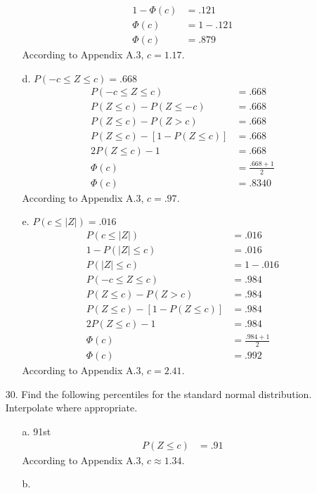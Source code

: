 \documentclass[letterpaper,12pt]{article}
\begin{document}
\begin{enumerate}
\begin{enumerate}
\begin{align*}
          1 - \Phi(c) &= .121 \\
          \Phi(c) &= 1 - .121 \\
          \Phi(c) &= .879
        \end{align*}
        According to Appendix A.3, $c = 1.17$.
      \item[d.]
        $P(-c \le Z \le c) = .668$
        \begin{align*}
          P(-c \le Z \le c) &= .668 \\
          P(Z \le c) - P(Z \le -c) &= .668 \\
          P(Z \le c) - P(Z > c) &= .668 \\
          P(Z \le c) - [1 - P(Z \le c)] &= .668 \\
          2P(Z \le c) - 1 &= .668 \\
          \Phi(c) &= \frac{.668 + 1}{2} \\
          \Phi(c) &= .8340
        \end{align*}
        According to Appendix A.3, $c = .97$.
      \item[e.]
        $P(c \le |Z|) = .016$
        \begin{align*}
          P(c \le |Z|) &= .016 \\
          1 - P(|Z| \le c) &= .016 \\
          P(|Z| \le c) &= 1 - .016 \\
          P(-c \le Z \le c) &= .984 \\
          P(Z \le c) - P(Z > c) &= .984 \\
          P(Z \le c) - [1 - P(Z \le c)] &= .984 \\
          2P(Z \le c) - 1 &= .984 \\
          \Phi(c) &= \frac{.984 + 1}{2} \\
          \Phi(c) &= .992
        \end{align*}
        According to Appendix A.3, $c = 2.41$.
    \end{enumerate}
  \item[30.]
    Find the following percentiles for the standard normal distribution. Interpolate where appropriate.
    \begin{enumerate}
      \item[a.]
        91st
        \begin{align*}
          P(Z \le c) &= .91
        \end{align*}
        According to Appendix A.3, $c \approx 1.34$.
      \item[b.]

\end{enumerate}
\end{enumerate}
\end{document}

